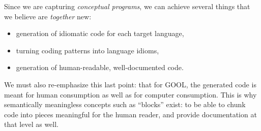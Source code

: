 \documentclass[sigplan,review,anonymous,prologue,dvipsnames]{acmart}
\begin{document}
Since we are capturing \emph{conceptual programs}, we can achieve
several things that we believe are \emph{together} new:
\begin{itemize}
\item generation of idiomatic code for each target language,
\item turning coding patterns into language idioms,
\item generation of human-readable, well-documented code.
\end{itemize}

We must also re-emphasize this last point: that for GOOL, the generated code
is meant for human consumption as well as for computer consumption. This is
why semantically meaningless concepts such as ``blocks'' exist: to be able
to chunk code into pieces meaningful for the human reader, and provide
documentation at that level as well.






% 
% 
\end{document}
